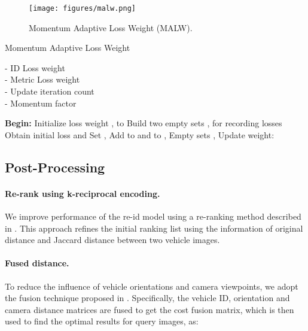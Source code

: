\documentclass[10pt,twocolumn,letterpaper]{article}
\begin{document}
\begin{figure}
	\texttt{[image: figures/malw.png]}
	\caption{Momentum Adaptive Loss Weight (MALW).}
	\label{fig:malw}
\end{figure}

\begin{algorithm}[t]
	\renewcommand{\algorithmicrequire}{\textbf{Input:}}
	\renewcommand{\algorithmicensure}{\textbf{Output:}}
	\caption{Momentum Adaptive Loss Weight}	\begin{algorithmic}[1]
		\REQUIRE
		{\begin{minipage}[t]{6cm}\strut
				- ID Loss weight  \\
				- Metric Loss weight  \\
				- Update iteration count  \\
				- Momentum factor 
				\strut
			\end{minipage}}
		\STATE \textbf{Begin:}
		\STATE Initialize loss weight ,  to 
		\STATE Build two empty sets ,  for recording losses
		\STATE Obtain initial loss  and 
		\STATE Set , 
		\STATE Add  to  and  to  
		\IF{}
		\STATE , 
		\STATE Empty sets , 
		\IF{}
		\STATE 
		\STATE Update weight: 
		\ENDIF
		\ENDIF
		\ENDFOR	
		\ENSURE 
	\end{algorithmic}
	\label{al:solution}
\end{algorithm}

\subsection{Post-Processing} \label{sub:post_processing}
\paragraph{Re-rank using k-reciprocal encoding.} We improve performance of the re-id model using a re-ranking method described in \cite{rerank}. This approach refines the initial ranking list using the information of original distance and Jaccard distance between two vehicle images.

\paragraph{Fused distance.} To reduce the influence of vehicle orientations and camera viewpoints, we adopt the fusion technique proposed in \cite{2nd}. Specifically, the vehicle ID, orientation and camera distance matrices are fused to get the cost fusion matrix, which is then used to find the optimal results for query images, as:
\end{document}
